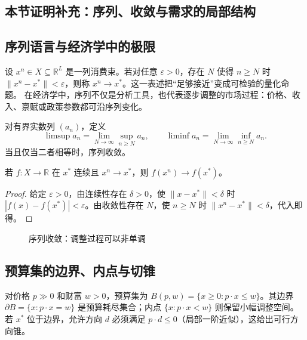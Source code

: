 \subsection{本节证明补充：序列、收敛与需求的局部结构}

\subsection{序列语言与经济学中的极限}
设 $x^n\in X\subseteq\mathbb R^L$ 是一列消费束。若对任意 $\varepsilon>0$，存在 $N$ 使得 $n\ge N$ 时
$\|x^n-x^*\|<\varepsilon$，则称 $x^n\to x^*$。这一表述把“足够接近”变成可检验的量化命题。
在经济学中，序列不仅是分析工具，也代表逐步调整的市场过程：价格、收入、禀赋或政策参数都可沿序列变化。

\begin{definition}[上极限与下极限]
对有界实数列 $(a_n)$，定义
\[
\limsup a_n=\lim_{N\to\infty}\sup_{n\ge N}a_n,\qquad
\liminf a_n=\lim_{N\to\infty}\inf_{n\ge N}a_n.
\]
当且仅当二者相等时，序列收敛。
\end{definition}

\begin{proposition}[连续函数保持序列收敛]
若 $f:X\to\mathbb R$ 在 $x^*$ 连续且 $x^n\to x^*$，则 $f(x^n)\to f(x^*)$。
\end{proposition}
\begin{proof}
给定 $\varepsilon>0$，由连续性存在 $\delta>0$，使 $\|x-x^*\|<\delta$ 时
$|f(x)-f(x^*)|<\varepsilon$。由收敛性存在 $N$，使 $n\ge N$ 时 $\|x^n-x^*\|<\delta$，代入即得。
\end{proof}

\begin{figure}[H]\centering
{}
\caption{序列收敛：调整过程可以非单调}
\end{figure}

\subsection{预算集的边界、内点与切锥}
对价格 $p\gg0$ 和财富 $w>0$，预算集为 $B(p,w)=\{x\ge0:p\cdot x\le w\}$。其边界
$\partial B=\{x:p\cdot x=w\}$ 是预算耗尽集合；内点 $\{x:p\cdot x<w\}$ 则保留小幅调整空间。
若 $x^*$ 位于边界，允许方向 $d$ 必须满足 $p\cdot d\le0$（局部一阶近似），这给出可行方向锥。

